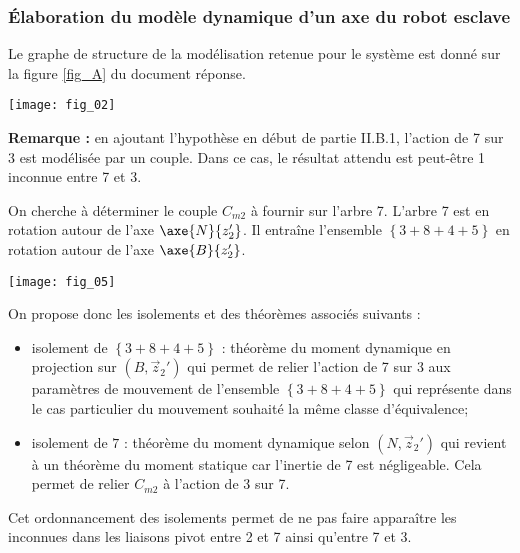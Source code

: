 \subsubsection{Élaboration du modèle dynamique d'un axe du robot esclave}
Le graphe de structure de la modélisation retenue pour le système est donné sur la figure \ref{fig_A} du document réponse.\\
\ifprof
\begin{corrige}
\begin{center}
\texttt{[image: fig\_02]}
\end{center}

\textbf{Remarque :} en ajoutant l'hypothèse en début de partie II.B.1, l'action de 7 sur 3 est modélisée par un couple. Dans ce cas, le résultat attendu est peut-être 1 inconnue entre 7 et 3.
\end{corrige}
\else
\fi


\ifprof
\begin{corrige}
On cherche à déterminer le couple $C_{m2}$ à fournir sur l'arbre 7. L'arbre 7 est en rotation autour de l'axe $\axe{N}{z_2'}$. Il entraîne l'ensemble $\left\{3+8+4+5\right\}$ en rotation autour de l'axe $\axe{B}{z_2'}$.

\begin{center}
\texttt{[image: fig\_05]}
\end{center}

On propose donc les isolements et des théorèmes associés suivants : 
\begin{itemize}
\item isolement de $\left\{3+8+4+5\right\}$ : théorème du moment dynamique en projection sur $\left(B,\overrightarrow{z}_2'\right)$ qui permet de relier l'action de 7 sur 3 aux paramètres de mouvement de l'ensemble $\left\{3+8+4+5\right\}$ qui représente dans le cas particulier du mouvement souhaité la même classe d'équivalence;
\item isolement de $7$ : théorème du moment dynamique selon $\left(N,\overrightarrow{z}_2'\right)$ qui revient à un théorème du moment statique car l'inertie de 7 est négligeable. Cela permet de relier $C_{m2}$ à l'action de 3 sur 7.
\end{itemize}
Cet ordonnancement des isolements permet de ne pas faire apparaître les inconnues dans les liaisons pivot entre 2 et 7 ainsi qu'entre 7 et 3. 
\end{corrige}
\else
\fi



